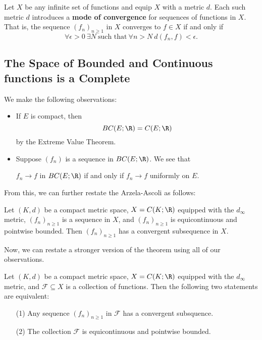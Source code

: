 Let \( X \) be any infinite set of functions and equip \( X  \) with a metric \( d \). Each such metric \( d \) introduces a \textbf{mode of convergence} for sequences of functions in \( X  \). That is, the sequence \( ({f}_{n})_{n \geq 1 } \) in \( X  \) converges to \( f \in X  \) if and only if
\[  \forall \epsilon  > 0 \ \exists N \ \text{such that} \ \forall n > N \ d({f}_{n}, f) < \epsilon.   \]

\subsection{The Space of Bounded and Continuous functions is a Complete}

We make the following observations:

\begin{itemize}
    \item If \( E  \) is compact, then 
        \[ BC(E ; \R ) = C (E ; \R )  \]
        by the Extreme Value Theorem.
    \item Suppose \( ({f}_{n})  \) is a sequence in \( BC(E;\R) \). We see that  
        \begin{center}
            \( {f}_{n} \to f  \) in \( BC(E;\R) \) if and only if \( {f}_{n} \to f  \) uniformly on \( E  \).
        \end{center}
\end{itemize} 

From this, we can further restate the Arzela-Ascoli as follows:

\begin{theorem}
    Let \( (K,d) \) be a compact metric space, \( X = C(K ; \R ) \) equipped with the \( {d}_{\infty } \) metric, \( ({f}_{n})_{n \geq 1} \) is a sequence in \( X  \), and \( ({f}_{n})_{n \geq 1}  \) is equicontinuous and pointwise bounded. Then \( ({f}_{n})_{n \geq 1 } \) has a convergent subsequence in \( X  \).
\end{theorem}

Now, we can restate a stronger version of the theorem using all of our observations.

\begin{theorem}
    Let \( (K,d) \) be a compact metric space, \( X = C(K;\R) \) equipped with the \( {d}_{\infty } \) metric, and \( \mathcal{F} \subseteq  X  \) is a collection of functions. Then the following two statements are equivalent:
    \begin{enumerate}
        \item[(1)] Any sequence \( ({f}_{n})_{n \geq 1}  \) in \( \mathcal{F} \) has a convergent subsquence.
        \item[(2)] The collection \( \mathcal{F} \) is equicontinuous and pointwise bounded.
    \end{enumerate}
\end{theorem}

